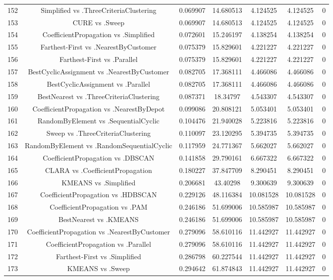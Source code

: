 \documentclass[a4paper,10pt]{article}
\begin{document}
\begin{landscape}
\begin{table}[!htp]
\begin{tabular}{ccccccc}
152&Simplified vs .ThreeCriteriaClustering&0.069907&14.680513&4.124525&4.124525&0\\
153&CURE vs .Sweep&0.069907&14.680513&4.124525&4.124525&0\\
154&CoefficientPropagation vs .Simplified&0.072601&15.246197&4.138254&4.138254&0\\
155&Farthest-First vs .NearestByCustomer&0.075379&15.829601&4.221227&4.221227&0\\
156&Farthest-First vs .Parallel&0.075379&15.829601&4.221227&4.221227&0\\
157&BestCyclicAssignment vs .NearestByCustomer&0.082705&17.368111&4.466086&4.466086&0\\
158&BestCyclicAssignment vs .Parallel&0.082705&17.368111&4.466086&4.466086&0\\
159&BestNearest vs .ThreeCriteriaClustering&0.087371&18.34797&4.543307&4.543307&0\\
160&CoefficientPropagation vs .NearestByDepot&0.099086&20.808121&5.053401&5.053401&0\\
161&RandomByElement vs .SequentialCyclic&0.104476&21.940028&5.223816&5.223816&0\\
162&Sweep vs .ThreeCriteriaClustering&0.110097&23.120295&5.394735&5.394735&0\\
163&RandomByElement vs .RandomSequentialCyclic&0.117959&24.771367&5.662027&5.662027&0\\
164&CoefficientPropagation vs .DBSCAN&0.141858&29.790161&6.667322&6.667322&0\\
165&CLARA vs .CoefficientPropagation&0.180227&37.847709&8.290451&8.290451&0\\
166&KMEANS vs .Simplified&0.206681&43.40298&9.300639&9.300639&0\\
167&CoefficientPropagation vs .HDBSCAN&0.229126&48.116384&10.081528&10.081528&0\\
168&CoefficientPropagation vs .PAM&0.246186&51.699006&10.585987&10.585987&0\\
169&BestNearest vs .KMEANS&0.246186&51.699006&10.585987&10.585987&0\\
170&CoefficientPropagation vs .NearestByCustomer&0.279096&58.610116&11.442927&11.442927&0\\
171&CoefficientPropagation vs .Parallel&0.279096&58.610116&11.442927&11.442927&0\\
172&Farthest-First vs .Simplified&0.286798&60.227544&11.442927&11.442927&0\\
173&KMEANS vs .Sweep&0.294642&61.874843&11.442927&11.442927&0\\

\end{tabular}
\end{table}
\end{landscape}
\end{document}
